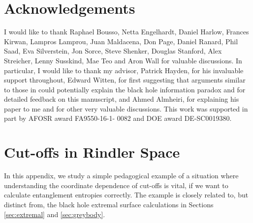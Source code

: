 \documentclass[11pt,a4paper]{article}
\begin{document}
\section{Acknowledgements}
I would like to thank Raphael Bousso, Netta Engelhardt, Daniel Harlow, Frances Kirwan, Lampros Lamprou, Juan Maldacena, Don Page, Daniel Ranard, Phil Saad, Eva Silverstein, Jon Sorce, Steve Shenker, Douglas Stanford, Alex Streicher, Lenny Susskind, Mae Teo and Aron Wall for valuable discussions. In particular, I would like to thank my advisor, Patrick Hayden, for his invaluable support throughout, Edward Witten, for first suggesting that arguments similar to those in \cite{hayden2018learning} could potentially explain the black hole information paradox and for detailed feedback on this manuscript, and Ahmed Almheiri, for explaining his paper \cite{almheiri2018holographic} to me and for other very valuable discussions. This work was supported in part by AFOSR award FA9550-16-1- 0082 and DOE award {DE-SC0019380}.

\appendix

\section{Cut-offs in Rindler Space} \label{app:rindler}
In this appendix, we study a simple pedagogical example of a situation where understanding the coordinate dependence of cut-offs is vital, if we want to calculate entanglement entropies correctly. The example is closely related to, but distinct from, the black hole extremal surface calculations in Sections \ref{sec:extremal} and \ref{sec:greybody}.
\end{document}
